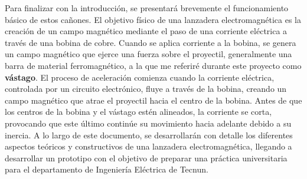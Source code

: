 Para finalizar con la introducción, se presentará brevemente el funcionamiento básico de estos cañones. El objetivo físico de una lanzadera electromagnética es la creación de un campo magnético mediante el paso de una corriente eléctrica a través de una bobina de cobre. Cuando se aplica corriente a la bobina, se genera un campo magnético que ejerce una fuerza sobre el proyectil, generalmente una barra de material ferromagnético, a la que me referiré durante este proyecto como \textbf{vástago}. El proceso de aceleración comienza cuando la corriente eléctrica, controlada por un circuito electrónico, fluye a través de la bobina, creando un campo magnético que atrae el proyectil hacia el centro de la bobina. Antes de que los centros de la bobina y el vástago estén alineados, la corriente se corta, provocando que este último continúe su movimiento hacia adelante debido a su inercia. A lo largo de este documento, se desarrollarán con detalle los diferentes aspectos teóricos y constructivos de una lanzadera electromagnética, llegando a desarrollar un prototipo con el objetivo de preparar una práctica universitaria para el departamento de Ingeniería Eléctrica de Tecnun.